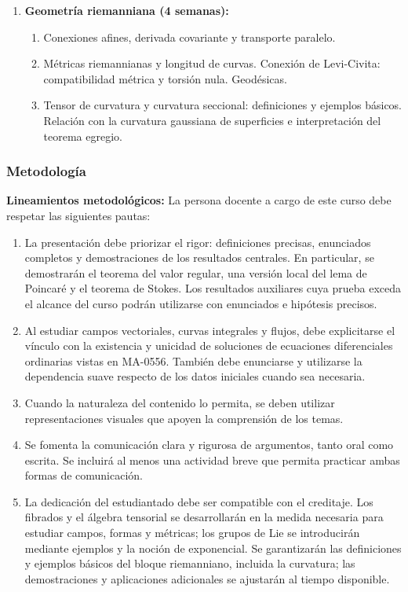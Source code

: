 \begin{refsection}
\begin{enumerate}
\item \textbf{Geometría riemanniana (4 semanas):}
\begin{enumerate}
    \item Conexiones afines, derivada covariante y transporte paralelo.
    \item Métricas riemannianas y longitud de curvas. Conexión de Levi-Civita: compatibilidad métrica y torsión nula. Geodésicas.
    \item Tensor de curvatura y curvatura seccional: definiciones y ejemplos básicos. Relación con la curvatura gaussiana de superficies e interpretación del teorema egregio.
\end{enumerate}

\end{enumerate}

\subsubsection*{Metodología}

\noindent \textbf{Lineamientos metodológicos:} La persona docente a cargo de este curso debe respetar las siguientes pautas:
\begin{enumerate}
    \item La presentación debe priorizar el rigor: definiciones precisas, enunciados completos y demostraciones de los resultados centrales. En particular, se demostrarán el teorema del valor regular, una versión local del lema de Poincaré y el teorema de Stokes. Los resultados auxiliares cuya prueba exceda el alcance del curso podrán utilizarse con enunciados e hipótesis precisos.
    \item Al estudiar campos vectoriales, curvas integrales y flujos, debe explicitarse el vínculo con la existencia y unicidad de soluciones de ecuaciones diferenciales ordinarias vistas en MA-0556. También debe enunciarse y utilizarse la dependencia suave respecto de los datos iniciales cuando sea necesaria.
    \item Cuando la naturaleza del contenido lo permita, se deben utilizar representaciones visuales que apoyen la comprensión de los temas.
    \item Se fomenta la comunicación clara y rigurosa de argumentos, tanto oral como escrita. Se incluirá al menos una actividad breve que permita practicar ambas formas de comunicación.
  \item La dedicación del estudiantado debe ser compatible con el creditaje. Los fibrados y el álgebra tensorial se desarrollarán en la medida necesaria para estudiar campos, formas y métricas; los grupos de Lie se introducirán mediante ejemplos y la noción de exponencial. Se garantizarán las definiciones y ejemplos básicos del bloque riemanniano, incluida la curvatura; las demostraciones y aplicaciones adicionales se ajustarán al tiempo disponible.
\end{enumerate}


\end{refsection}
